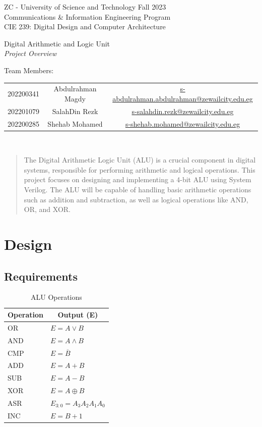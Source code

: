 \documentclass{article}
\makeatletter
\renewcommand{\maketitle}{
  \begin{flushleft}
    ZC - University of Science and Technology
    \hfill Fall 2023 \\
    Communications \& Information Engineering Program \\
    CIE 239: Digital Design and Computer Architecture
  \end{flushleft}
  \begin{center}
    \Huge Digital Arithmetic and Logic Unit \\
    \Large \textit{Project Overview}
  \end{center}
  \begin{flushleft}
    Team Members: \\

    \begin{tabular}{ccc}
      202200341 & Abdulrahman Magdy & \href{mailto:s-abdulrahman.abdulrahman@zewailcity.edu.eg}{s-abdulrahman.abdulrahman@zewailcity.edu.eg} \\
      202201079 & SalahDin Rezk & \href{mailto:s-salahdin.rezk@zewailcity.edu.eg}{s-salahdin.rezk@zewailcity.edu.eg} \\
      202200285 & Shehab Mohamed & \href{mailto:s-shehab.mohamed@zewailcity.edu.eg}{s-shehab.mohamed@zewailcity.edu.eg} \\
    \end{tabular}  \\
  \end{flushleft}
}
\makeatother
\begin{document}
\maketitle
\tableofcontents
\listoffigures
\listoftables

\begin{abstract}
  The Digital Arithmetic Logic Unit (ALU) is a crucial component in digital
  systems, responsible for performing arithmetic and logical operations. This
  project focuses on designing and implementing a 4-bit ALU using System Verilog.
  The ALU will be capable of handling basic arithmetic operations such as
  addition and subtraction, as well as logical operations like AND, OR, and
  XOR.
\end{abstract}

\section{Design}

\subsection{Requirements}

\begin{table}[H]
  \caption{ALU Operations}
  \begin{center}
    \begin{tabular}[c]{l|l}
      \hline
      \multicolumn{1}{c|}{\textbf{Operation}} & 
      \multicolumn{1}{c}{\textbf{Output (E)}} \\
      \hline
      OR & $E = A \lor B$ \\
      AND & $E = A \land B$ \\
      CMP & $E = \overline{B} $ \\
      ADD & $E = A + B$ \\
      SUB & $E = A - B$ \\
      XOR & $E = A \oplus B$ \\
      ASR & $E_{3:0}=A_{3}A_{2}A_{1}A_{0}$ \\
      INC & $E = B + 1$ \\
      \hline
    \end{tabular}
  \end{center}
\end{table}
\end{document}
